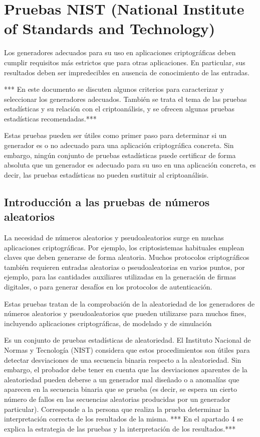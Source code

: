 \chapter{Pruebas NIST (National Institute of Standards and Technology) }

	Los generadores adecuados para su uso en aplicaciones criptográficas deben cumplir requisitos más estrictos que para otras aplicaciones. En particular, sus resultados deben ser impredecibles en ausencia de conocimiento de las entradas.
	
	 *** En este documento se discuten algunos criterios para caracterizar y seleccionar los generadores adecuados. También se trata el tema de las pruebas estadísticas y su relación con el criptoanálisis, y se ofrecen algunas pruebas estadísticas recomendadas.***
	 
	 Estas pruebas pueden ser útiles como primer paso para determinar si un generador es o no adecuado para una aplicación criptográfica concreta. Sin embargo, ningún conjunto de pruebas estadísticas puede certificar de forma absoluta que un generador es adecuado para su uso en una aplicación concreta, es decir, las pruebas estadísticas no pueden sustituir al criptoanálisis.
	 
	
	\section{Introducción a las pruebas de números aleatorios}	
	 
	La necesidad de números aleatorios y pseudoaleatorios surge en muchas aplicaciones criptográficas. Por ejemplo, los criptosistemas habituales emplean claves que deben generarse de forma aleatoria. Muchos protocolos criptográficos también requieren entradas aleatorias o pseudoaleatorias en varios puntos, por ejemplo, para las cantidades auxiliares utilizadas en la generación de firmas digitales, o para generar desafíos en los protocolos de autenticación.
	
	Estas pruebas tratan de la comprobación de la aleatoriedad de los generadores de números aleatorios y pseudoaleatorios que pueden utilizarse para muchos fines, incluyendo aplicaciones criptográficas, de modelado y de simulación
	
	Es un conjunto de pruebas estadísticas de aleatoriedad. El Instituto Nacional de Normas y Tecnología (NIST) considera que estos procedimientos son útiles para detectar desviaciones de una secuencia binaria respecto a la aleatoriedad. Sin embargo, el probador debe tener en cuenta que las desviaciones aparentes de la aleatoriedad pueden deberse a un generador mal diseñado o a anomalías que aparecen en la secuencia binaria que se prueba (es decir, se espera un cierto número de fallos en las secuencias aleatorias producidas por un generador particular). Corresponde a la persona que realiza la prueba determinar la interpretación correcta de los resultados de la misma. *** En el apartado 4 se explica la estrategia de las pruebas y la interpretación de los resultados.***

